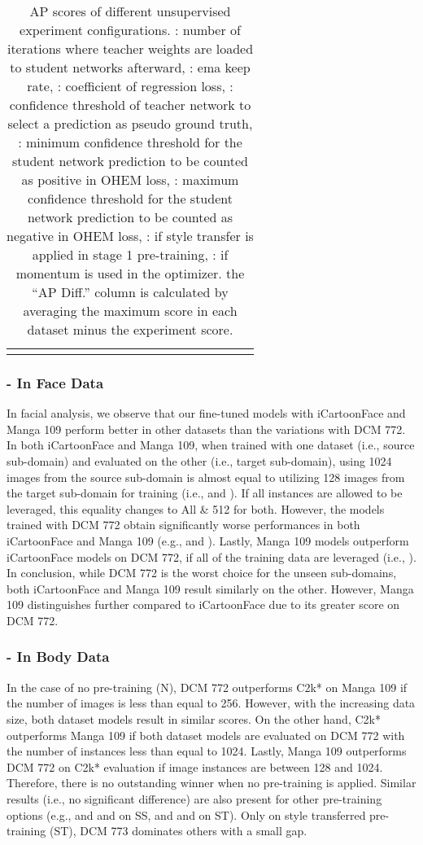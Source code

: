\documentclass{article}
\begin{document}
\begin{table*}
{\begin{tabular}{c|ccccccccc|ccc|ccccc|c}
    \noalign{\smallskip}
    \hline
\end{tabular}
}
\caption{AP scores of different unsupervised experiment configurations. : number of iterations where teacher weights are loaded to student networks afterward, : ema keep rate, : coefficient of regression loss, : confidence threshold of teacher network to select a prediction as pseudo ground truth, :  minimum confidence threshold for the student network prediction to be counted as positive in OHEM loss, : maximum confidence threshold for the student network prediction to be counted as negative in OHEM loss, : if style transfer is applied in stage 1 pre-training, : if momentum is used in the optimizer. the “AP Diff.” column is calculated by averaging the maximum score in each dataset minus the experiment score.}
\label{table:sup_stage_2_results}
\end{table*} 
\subsubsection{- In Face Data} 

In facial analysis, we observe that our fine-tuned models with iCartoonFace and Manga 109 perform better in other datasets than the variations with DCM 772. In both iCartoonFace and Manga 109, when trained with one dataset (i.e., source sub-domain) and evaluated on the other (i.e., target sub-domain), using 1024 images from the source sub-domain is almost equal to utilizing 128 images from the target sub-domain for training (i.e.,  and ). If all instances are allowed to be leveraged, this equality changes to All \& 512 for both. However, the models trained with DCM 772 obtain significantly worse performances in both iCartoonFace and Manga 109 (e.g.,  and ). Lastly, Manga 109 models outperform iCartoonFace models on DCM 772, if all of the training data are leveraged (i.e., ). In conclusion, while DCM 772 is the worst choice for the unseen sub-domains, both iCartoonFace and Manga 109 result similarly on the other. However, Manga 109 distinguishes further compared to iCartoonFace due to its greater score on DCM 772.



\subsubsection{- In Body Data} 

In the case of no pre-training (N), DCM 772 outperforms C2k* on Manga 109 if the number of images is less than equal to 256. However, with the increasing data size, both dataset models result in similar scores. On the other hand, C2k* outperforms Manga 109 if both dataset models are evaluated on DCM 772 with the number of instances less than equal to 1024. Lastly, Manga 109 outperforms DCM 772 on C2k* evaluation if image instances are between 128 and 1024. Therefore, there is no outstanding winner when no pre-training is applied. Similar results (i.e., no significant difference) are also present for other pre-training options (e.g.,  and  and  on SS,  and  and  on ST). Only on style transferred pre-training (ST), DCM 773 dominates others with a small gap.
\end{document}
